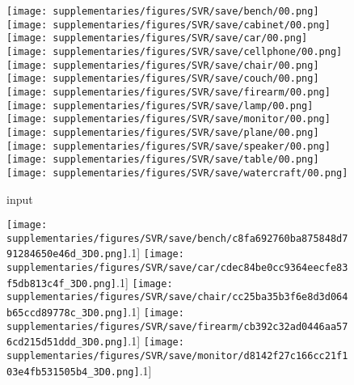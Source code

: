 \documentclass[10pt,twocolumn,letterpaper]{article}
\begin{document}
\newpage
\begin{figure*}[t!]
\centering
\begin{subfigure}[b]{0.24\linewidth}
\centering
 \texttt{[image: supplementaries/figures/SVR/save/bench/00.png]}\\
 \texttt{[image: supplementaries/figures/SVR/save/cabinet/00.png]}\\
 \texttt{[image: supplementaries/figures/SVR/save/car/00.png]}\\
 \texttt{[image: supplementaries/figures/SVR/save/cellphone/00.png]}\\
 \texttt{[image: supplementaries/figures/SVR/save/chair/00.png]}\\
 \texttt{[image: supplementaries/figures/SVR/save/couch/00.png]}\\
 \texttt{[image: supplementaries/figures/SVR/save/firearm/00.png]}\\
 \texttt{[image: supplementaries/figures/SVR/save/lamp/00.png]}\\
 \texttt{[image: supplementaries/figures/SVR/save/monitor/00.png]}\\
 \texttt{[image: supplementaries/figures/SVR/save/plane/00.png]}\\
 \texttt{[image: supplementaries/figures/SVR/save/speaker/00.png]}\\
 \texttt{[image: supplementaries/figures/SVR/save/table/00.png]}\\
 \texttt{[image: supplementaries/figures/SVR/save/watercraft/00.png]}
\caption{input}
\end{subfigure}
\begin{subfigure}[b]{0.24\linewidth}
\centering
 \texttt{[image: supplementaries/figures/SVR/save/bench/c8fa692760ba875848d791284650e46d\_3D0.png]}\0.1\linewidth]
 \texttt{[image: supplementaries/figures/SVR/save/car/cdec84be0cc9364eecfe83f5db813c4f\_3D0.png]}\0.1\linewidth]
 \texttt{[image: supplementaries/figures/SVR/save/chair/cc25ba35b3f6e8d3d064b65ccd89778c\_3D0.png]}\0.1\linewidth]
 \texttt{[image: supplementaries/figures/SVR/save/firearm/cb392c32ad0446aa576cd215d51ddd\_3D0.png]}\0.1\linewidth]
 \texttt{[image: supplementaries/figures/SVR/save/monitor/d8142f27c166cc21f103e4fb531505b4\_3D0.png]}\0.1\linewidth]

\end{subfigure}
\end{figure*}
\end{document}
